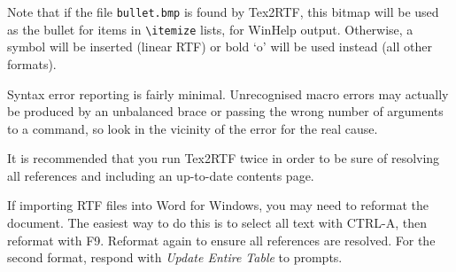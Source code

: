 Note that if the file {\tt bullet.bmp} is found by Tex2RTF, this bitmap
will be used as the bullet for items in \verb$\itemize$ lists, for WinHelp
output. Otherwise, a symbol will be inserted (linear RTF) or bold `o'
will be used instead (all other formats).

Syntax error reporting is fairly minimal. Unrecognised macro errors may
actually be produced by an unbalanced brace or passing the wrong number of
arguments to a command, so look in the vicinity of the error for the
real cause.


It is recommended that you run Tex2RTF twice in order to be sure of
resolving all references and including an up-to-date contents page.

If importing RTF files into Word for Windows, you may need to reformat
the document. The easiest way to do this is to select all text with
CTRL-A, then reformat with F9. Reformat again to ensure all references
are resolved. For the second format, respond with {\it Update Entire
Table} to prompts.


